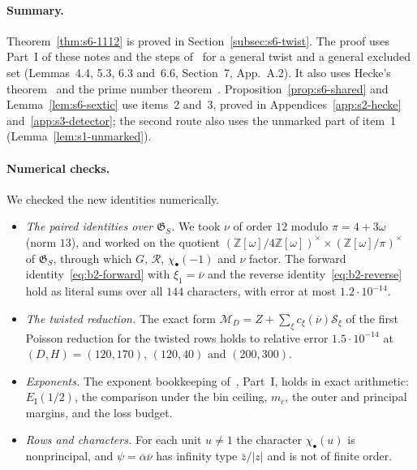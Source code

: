 \documentclass[11pt]{article}
\numberwithin{equation}{section}
\newcommand{\OO}{\mathbb Z[\omega]}
\begin{document}
\paragraph{Summary.} Theorem~\ref{thm:s6-1112} is proved in Section~\ref{subsec:s6-twist}. The proof uses
Part~I of these notes and the steps of~\cite{OAI1112} for a general twist and a general excluded set
(Lemmas~4.4, 5.3, 6.3 and~6.6, Section~7, App.~A.2). It also uses Hecke's theorem~\cite{Hec20} and the prime number theorem~\cite{Lan03}.
Proposition~\ref{prop:s6-shared} and Lemma~\ref{lem:s6-sextic} use items~2 and~3, proved in
Appendices~\ref{app:s2-hecke} and~\ref{app:s3-detector}; the second route also uses the unmarked part of item~1
(Lemma~\ref{lem:s1-unmarked}).

\paragraph{Numerical checks.} We checked the new identities numerically.
\begin{itemize}
\item \emph{The paired identities over $\mathfrak G_S$.} We took $\nu$ of order $12$ modulo
 $\pi=4+3\omega$ (norm $13$), and worked on the quotient $(\OO/4\OO)^\times\times(\OO/\pi)^\times$ of $\mathfrak G_S$,
 through which $G$, $\mathcal R$, $\chi_\bullet(-1)$ and $\nu$ factor. The forward
 identity~\eqref{eq:b2-forward} with $\xi_1=\overline\nu$ and the reverse identity~\eqref{eq:b2-reverse} hold as
 literal sums over all $144$ characters, with error at most $1.2\cdot10^{-14}$.
\item \emph{The twisted reduction.} The exact form $\mathcal M_D=Z+\sum_\xi c_\xi(\overline\nu)\mathcal S_\xi$ of
 the first Poisson reduction for the twisted rows holds to relative error $1.5\cdot10^{-14}$ at
 $(D,H)=(120,170)$, $(120,40)$ and $(200,300)$.
\item \emph{Exponents.} The exponent bookkeeping of~\cite{OAI78}, Part~I, holds in exact arithmetic:
 $E_{\mathrm I}(1/2)$, the comparison under the bin ceiling, $m_c$, the outer and principal margins, and the
 loss budget.
\item \emph{Rows and characters.} For each unit $u\ne1$ the character $\chi_\bullet(u)$ is nonprincipal, and
 $\psi=\overline\alpha\overline\nu$ has infinity type $\bar z/|z|$ and is not of finite order.
\end{itemize}
\end{document}
